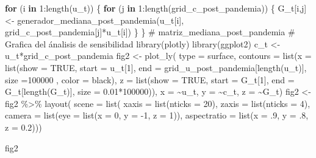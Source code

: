 \documentclass[
  us-letterpaper,
]{scrreprt}
\newenvironment{Shaded}{\begin{snugshade}}{\end{snugshade}}
\newcommand{\AttributeTok}[1]{\textcolor[rgb]{0.40,0.45,0.13}{#1}}
\newcommand{\CommentTok}[1]{\textcolor[rgb]{0.37,0.37,0.37}{#1}}
\newcommand{\ConstantTok}[1]{\textcolor[rgb]{0.56,0.35,0.01}{#1}}
\newcommand{\ControlFlowTok}[1]{\textcolor[rgb]{0.00,0.23,0.31}{\textbf{#1}}}
\newcommand{\DecValTok}[1]{\textcolor[rgb]{0.68,0.00,0.00}{#1}}
\newcommand{\FloatTok}[1]{\textcolor[rgb]{0.68,0.00,0.00}{#1}}
\newcommand{\FunctionTok}[1]{\textcolor[rgb]{0.28,0.35,0.67}{#1}}
\newcommand{\NormalTok}[1]{\textcolor[rgb]{0.00,0.23,0.31}{#1}}
\newcommand{\OtherTok}[1]{\textcolor[rgb]{0.00,0.23,0.31}{#1}}
\newcommand{\SpecialCharTok}[1]{\textcolor[rgb]{0.37,0.37,0.37}{#1}}
\newcommand{\StringTok}[1]{\textcolor[rgb]{0.13,0.47,0.30}{#1}}
\theoremstyle{definition}
\theoremstyle{plain}
\theoremstyle{plain}
\theoremstyle{remark}
\begin{document}
\begin{Shaded}
\begin{Highlighting}[]
\ControlFlowTok{for}\NormalTok{ (i }\ControlFlowTok{in} \DecValTok{1}\SpecialCharTok{:}\FunctionTok{length}\NormalTok{(u\_t)) }
\NormalTok{\{}
  \ControlFlowTok{for}\NormalTok{ (j }\ControlFlowTok{in} \DecValTok{1}\SpecialCharTok{:}\FunctionTok{length}\NormalTok{(grid\_c\_post\_pandemia)) }
\NormalTok{  \{}
\NormalTok{    G\_t[i,j] }\OtherTok{\textless{}{-}} \FunctionTok{generador\_mediana\_post\_pandemia}\NormalTok{(u\_t[i], }
\NormalTok{                                  grid\_c\_post\_pandemia[j]}\SpecialCharTok{*}\NormalTok{u\_t[i])}
\NormalTok{  \}}
\NormalTok{\}  }
\CommentTok{\# matriz\_mediana\_post\_pandemia  }
\CommentTok{\# Grafica del ánalisis de sensibilidad}
\FunctionTok{library}\NormalTok{(plotly)}
\FunctionTok{library}\NormalTok{(ggplot2)}
\NormalTok{c\_t }\OtherTok{\textless{}{-}}\NormalTok{ u\_t}\SpecialCharTok{*}\NormalTok{grid\_c\_post\_pandemia}
\NormalTok{fig2 }\OtherTok{\textless{}{-}} \FunctionTok{plot\_ly}\NormalTok{(}
  \AttributeTok{type =} \StringTok{\textquotesingle{}surface\textquotesingle{}}\NormalTok{,}
  \AttributeTok{contours =} \FunctionTok{list}\NormalTok{(}\AttributeTok{x =} \FunctionTok{list}\NormalTok{(}\AttributeTok{show =} \ConstantTok{TRUE}\NormalTok{, }\AttributeTok{start =}\NormalTok{ u\_t[}\DecValTok{1}\NormalTok{], }
                  \AttributeTok{end =}\NormalTok{ grid\_u\_post\_pandemia[}\FunctionTok{length}\NormalTok{(u\_t)], }
                  \AttributeTok{size =}\DecValTok{100000}\NormalTok{ , }\AttributeTok{color =} \StringTok{\textquotesingle{}black\textquotesingle{}}\NormalTok{),}
                  \AttributeTok{z =} \FunctionTok{list}\NormalTok{(}\AttributeTok{show =} \ConstantTok{TRUE}\NormalTok{, }\AttributeTok{start =}\NormalTok{ G\_t[}\DecValTok{1}\NormalTok{], }
                  \AttributeTok{end =}\NormalTok{ G\_t[}\FunctionTok{length}\NormalTok{(G\_t)], }
                  \AttributeTok{size =} \FloatTok{0.01}\SpecialCharTok{*}\DecValTok{100000}\NormalTok{)),}
  \AttributeTok{x =} \SpecialCharTok{\textasciitilde{}}\NormalTok{u\_t,}
  \AttributeTok{y =} \SpecialCharTok{\textasciitilde{}}\NormalTok{c\_t,}
  \AttributeTok{z =} \SpecialCharTok{\textasciitilde{}}\NormalTok{G\_t)}
\NormalTok{fig2 }\OtherTok{\textless{}{-}}\NormalTok{ fig2 }\SpecialCharTok{\%\textgreater{}\%} \FunctionTok{layout}\NormalTok{(}
    \AttributeTok{scene =} \FunctionTok{list}\NormalTok{(}
    \AttributeTok{xaxis =} \FunctionTok{list}\NormalTok{(}\AttributeTok{nticks =} \DecValTok{20}\NormalTok{),}
    \AttributeTok{zaxis =} \FunctionTok{list}\NormalTok{(}\AttributeTok{nticks =} \DecValTok{4}\NormalTok{),}
    \AttributeTok{camera =} \FunctionTok{list}\NormalTok{(}\AttributeTok{eye =} \FunctionTok{list}\NormalTok{(}\AttributeTok{x =} \DecValTok{0}\NormalTok{, }
                             \AttributeTok{y =} \SpecialCharTok{{-}}\DecValTok{1}\NormalTok{, }
                             \AttributeTok{z =} \DecValTok{1}\NormalTok{)),}
    \AttributeTok{aspectratio =} \FunctionTok{list}\NormalTok{(}\AttributeTok{x =}\NormalTok{ .}\DecValTok{9}\NormalTok{, }\AttributeTok{y =}\NormalTok{ .}\DecValTok{8}\NormalTok{, }\AttributeTok{z =} \FloatTok{0.2}\NormalTok{)))}

\NormalTok{fig2}
\end{Highlighting}
\end{Shaded}
\end{document}
